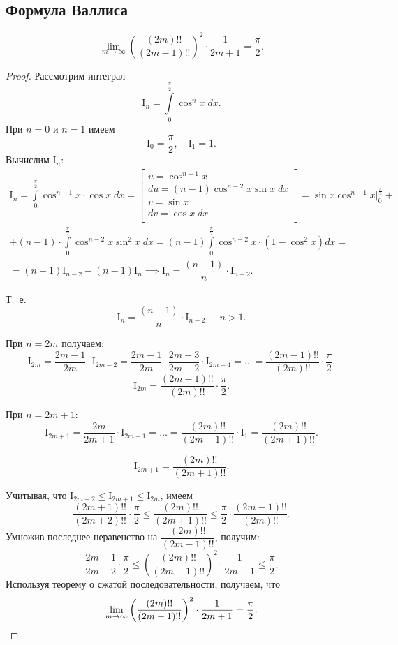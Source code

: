 \documentclass[../../main.tex]{subfiles}
\begin{document}
\subsection{Формула Валлиса}

\begin{thm}
\[\boxed{
\lim\limits_{m \to \infty} \left( \dfrac{(2m)!!} {(2m-1)!!}  \right)^2
\cdot \dfrac{1}{2m+1} = \dfrac{\pi}{2}.
}\]
\end{thm}
\begin{proof}
Рассмотрим интеграл
\[
\mathrm{I}_n = \int\limits_0^{\frac{\pi}{2}} \cos^n x \;dx.\]
При $n = 0$ и $n = 1$ имеем
\[\mathrm{I}_0 = \dfrac{\pi}{2}, \quad \mathrm{I}_{1} = 1.
\]
Вычислим $\mathrm{I}_n$:
\begin{gather*}
\mathrm{I}_n =  \int\limits_0^{\frac{\pi}{2}} \cos^{n - 1} x \cdot \cos x\;dx =
\left[\begin{array}{l}
u = \cos^{n-1}x\\
du = (n - 1) \cos^{n-2}x \sin x\;dx\\
v = \sin x \\
dv = \cos x\;dx\\
\end{array}\right]
= \sin x \cos^{n-1} x \Big|_0^{\frac{\pi}{2}} + 
\\
+ (n - 1) \cdot \int\limits_{0}^{\frac{\pi}{2}} \cos^{n-2}x \sin^2 x\; dx
= (n - 1) \int\limits_{0}^{\frac{\pi}{2}} \cos^{n-2}x \cdot (1 - \cos^{2}x)dx 
= \\
= (n-1)\mathrm{I}_{n-2} - (n-1)\mathrm{I}_{n} \implies 
\mathrm{I}_n = \dfrac{(n-1)}{n}\cdot\mathrm{I}_{n-2}.
\end{gather*}

Т.~е. \[\mathrm{I}_n = \dfrac{(n-1)}{n}\cdot\mathrm{I}_{n-2}, \quad n > 1.\]

При $n = 2m$ получаем:
\[
\mathrm{I}_{2m} = \dfrac{2m - 1}{2m} \cdot \mathrm{I}_{2m-2} = \dfrac{2m-1}{2m}
\cdot \dfrac{2m - 3}{2m-2} \cdot \mathrm{I}_{2m- 4} = \ldots =
\dfrac{(2m - 1)!!}{(2m)!!} \cdot \dfrac{\pi}{2}.
\]
\[\mathrm{I}_{2m} = \dfrac{(2m - 1)!!}{(2m)!!} \cdot \dfrac{\pi}{2}.\]

При $n = 2m+1$:
\[
\mathrm{I}_{2m + 1} = \dfrac{2m}{2m + 1} \cdot \mathrm{I}_{2m-1} = \ldots =
\dfrac{(2m)!!}{(2m + 1)!!} \cdot \mathrm{I}_{1} = \dfrac{(2m)!!}{(2m + 1)!!}.
\]

\[\mathrm{I}_{2m + 1} = \dfrac{(2m)!!}{(2m + 1)!!}.\]

Учитывая, что $
\mathrm{I}_{2m+2}\le \mathrm{I}_{2m+1}\le \mathrm{I}_{2m}
$, имеем
\[
\dfrac{(2m+1)!!}{(2m+2)!!} \cdot \dfrac{\pi}{2} \le \dfrac{(2m)!!}{(2m+1)!!} 
\le \dfrac{\pi}{2} \cdot \dfrac{(2m-1)!!}{(2m)!!}.
\]
Умножив последнее неравенство на $\dfrac{(2m)!!}{(2m-1)!!}$, получим:
\[
\dfrac{2m+1}{2m+2} \cdot \dfrac{\pi}{2} \le \left( \dfrac{(2m)!!}
{(2m-1)!!}  \right)^2 \cdot \dfrac{1}{2m+1} \le \dfrac{\pi}{2}.
\]
Используя теорему о сжатой последовательности, получаем, что
\[
\lim\limits_{m \to \infty} \left( \dfrac{(2m)!!} {(2m-1)!!}  \right)^2
\cdot \dfrac{1}{2m+1} = \dfrac{\pi}{2}. \qedhere
\]
\end{proof}
\end{document}
